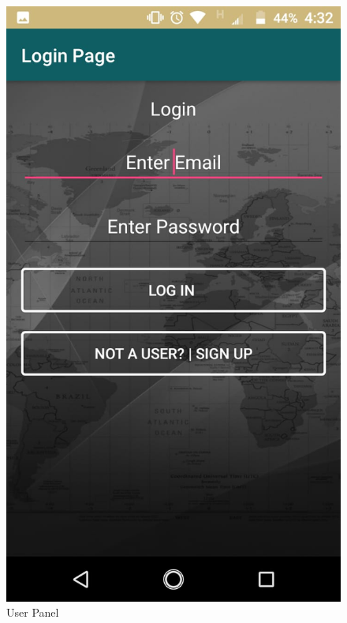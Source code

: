 \begin{figure}[!hb]
   \includegraphics[scale=0.2]{images/1.png}

 
   \caption{User Panel}\label{fig:picture}
\end{figure}
\newpage
